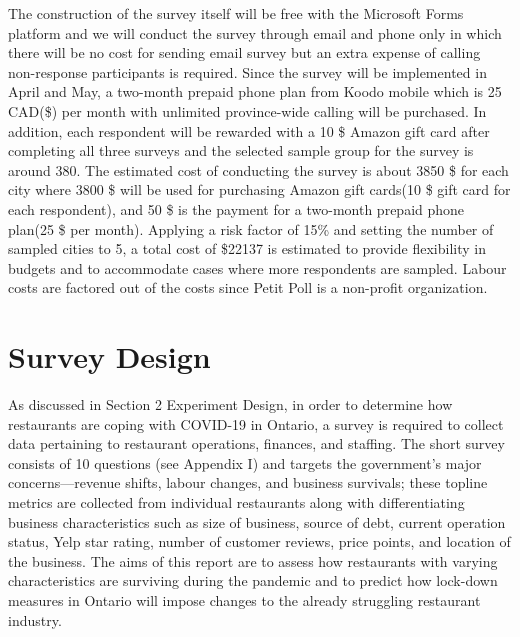\documentclass[
]{article}
\begin{document}
The construction of the survey itself will be free with the Microsoft Forms platform and we will conduct the survey through email and phone only in which there will be no cost for sending email survey but an extra expense of calling non-response participants is required. Since the survey will be implemented in April and May, a two-month prepaid phone plan from Koodo mobile which is 25 CAD(\$) per month with unlimited province-wide calling will be purchased. In addition, each respondent will be rewarded with a 10 \$ Amazon gift card after completing all three surveys and the selected sample group for the survey is around 380. The estimated cost of conducting the survey is about 3850 \$ for each city where 3800 \$ will be used for purchasing Amazon gift cards(10 \$ gift card for each respondent), and 50 \$ is the payment for a two-month prepaid phone plan(25 \$ per month). Applying a risk factor of 15\% and setting the number of sampled cities to 5, a total cost of \$22137 is estimated to provide flexibility in budgets and to accommodate cases where more respondents are sampled. Labour costs are factored out of the costs since Petit Poll is a non-profit organization.

\newpage

\hypertarget{survey-design}{%
\section{Survey Design}\label{survey-design}}

As discussed in Section 2 Experiment Design, in order to determine how restaurants are coping with COVID-19 in Ontario, a survey is required to collect data pertaining to restaurant operations, finances, and staffing. The short survey consists of 10 questions (see Appendix I) and targets the government's major concerns---revenue shifts, labour changes, and business survivals; these topline metrics are collected from individual restaurants along with differentiating business characteristics such as size of business, source of debt, current operation status, Yelp star rating, number of customer reviews, price points, and location of the business. The aims of this report are to assess how restaurants with varying characteristics are surviving during the pandemic and to predict how lock-down measures in Ontario will impose changes to the already struggling restaurant industry.
\end{document}
